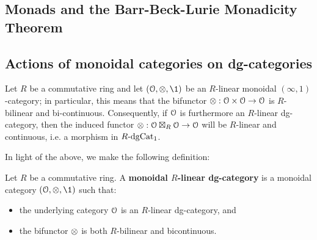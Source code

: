         \subsection{Monads and the Barr-Beck-Lurie Monadicity Theorem}

        \subsection{Actions of monoidal categories on dg-categories}
            Let $R$ be a commutative ring and let $(\calO, \tensor, \1)$ be an $R$-linear monoidal $(\infty, 1)$-category; in particular, this means that the bifunctor $\tensor: \calO \x \calO \to \calO$ is $R$-bilinear and bi-continuous. Consequently, if $\mathcal{O}$ is furthermore an $R$-linear dg-category, then the induced  functor $\tensor: \calO \boxtimes_R \calO \to \calO$ will be $R$-linear and continuous, i.e. a morphism in $R\text{-}\mathrm{dg}\mathrm{Cat}_1$.

            In light of the above, we make the following definition:
            \begin{definition} \label{def: monoidal_dg_categories}
                Let $R$ be a commutative ring. A \textbf{monoidal $R$-linear dg-category} is a monoidal category $(\calO, \tensor, \1)$ such that:
                \begin{itemize}
                    \item the underlying category $\mathcal{O}$ is an $R$-linear dg-category, and
                    \item the bifunctor $\tensor$ is both $R$-bilinear and bicontinuous.
                \end{itemize}
            \end{definition}

